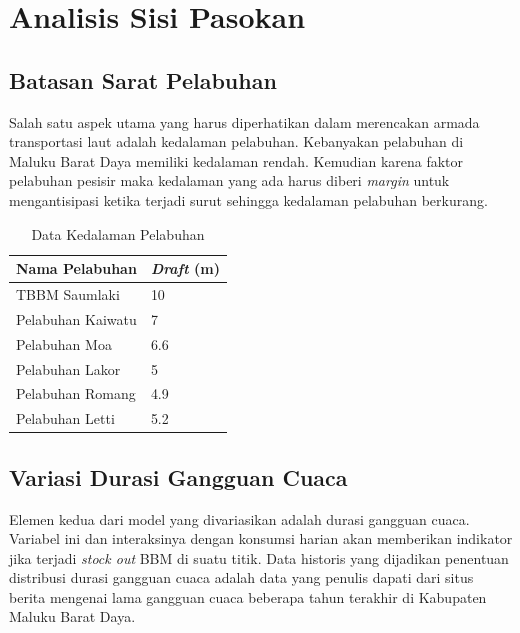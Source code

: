 \section{Analisis Sisi Pasokan}
\label{sec:supply-side-analysis}

\subsection{Batasan Sarat Pelabuhan}
\label{subsec:batasan-sarat-pelabuhan}

Salah satu aspek utama yang harus diperhatikan dalam merencakan armada transportasi laut adalah kedalaman pelabuhan. Kebanyakan pelabuhan di Maluku Barat Daya memiliki kedalaman rendah. Kemudian karena faktor pelabuhan pesisir maka kedalaman yang ada harus diberi \emph{margin} untuk mengantisipasi ketika terjadi surut sehingga kedalaman pelabuhan berkurang.

\begin{table}[!htbp]
    \centering
    \caption{Data Kedalaman Pelabuhan}
    \begin{tabular}{|l|l|}
    \hline
        Nama Pelabuhan & \emph{Draft} (m) \\ \hline
        TBBM Saumlaki & 10 \\ \hline
        Pelabuhan Kaiwatu & 7 \\ \hline
        Pelabuhan Moa & 6.6 \\ \hline
        Pelabuhan Lakor & 5 \\ \hline
        Pelabuhan Romang & 4.9 \\ \hline
        Pelabuhan Letti & 5.2 \\ \hline
    \end{tabular}
    \label{tabel-draft-port}
\end{table}

\subsection{Variasi Durasi Gangguan Cuaca}
\label{subsec:variasi-Durasi-gangguan-cuaca}

Elemen kedua dari model yang divariasikan adalah durasi gangguan cuaca. Variabel ini dan interaksinya dengan konsumsi harian akan memberikan indikator jika terjadi \emph{stock out} BBM di suatu titik. Data historis yang dijadikan penentuan distribusi durasi gangguan cuaca adalah data yang penulis dapati dari situs berita mengenai lama gangguan cuaca beberapa tahun terakhir di Kabupaten Maluku Barat Daya.

